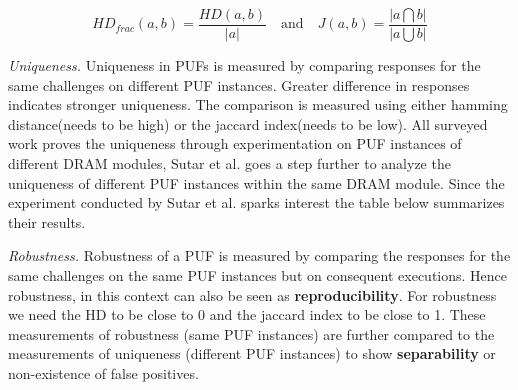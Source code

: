\documentclass[journal, a4paper]{IEEEtran}
\begin{document}
\[ HD_{frac}(a,b) = \dfrac{HD(a,b)}{|a|} \quad\text{and}\quad J(a,b) = \dfrac{| a \bigcap b |}{| a \bigcup b |} \]

\textit{Uniqueness.} Uniqueness in PUFs is measured by comparing responses for the same challenges on different PUF instances. Greater difference in responses indicates stronger uniqueness.  The comparison is measured using either hamming distance(needs to be high) or the jaccard index(needs to be low). All surveyed work proves the uniqueness through experimentation on PUF instances of different DRAM modules, Sutar et al. goes a step further to analyze the uniqueness of different PUF instances within the same DRAM module. Since the experiment conducted by Sutar et al. sparks interest the table below summarizes their results.




\textit{Robustness.} Robustness of a PUF is measured by comparing the responses for the same challenges on the same PUF instances but on consequent executions. Hence robustness, in this context can also be seen as \textbf{reproducibility}. For robustness we need the HD to be close to 0 and the jaccard index to be close to 1. These measurements of robustness (same PUF instances) are further compared to the measurements of uniqueness (different PUF instances) to show \textbf{separability} or non-existence of false positives.
\end{document}
